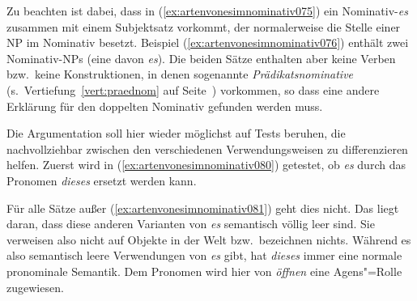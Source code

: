 \begin{exe}
  \ex\label{ex:artenvonesimnominativ073}
  \begin{xlist}
  \end{xlist}
\end{exe}

Zu beachten ist dabei, dass in (\ref{ex:artenvonesimnominativ075}) ein Nominativ-\textit{es} zusammen mit einem Subjektsatz vorkommt, der normalerweise die Stelle einer NP im Nominativ besetzt.
Beispiel (\ref{ex:artenvonesimnominativ076}) enthält zwei Nominativ-NPs (eine davon \textit{es}).
Die beiden Sätze enthalten aber keine Verben bzw.\ keine Konstruktionen, in denen sogenannte \textit{Prädikatsnominative} (s.\ Vertiefung~\ref{vert:praednom} auf Seite~\pageref{vert:praednom}) vorkommen, so dass eine andere Erklärung für den doppelten Nominativ gefunden werden muss.

Die Argumentation soll hier wieder möglichst auf Tests beruhen, die nachvollziehbar zwischen den verschiedenen Verwendungsweisen zu differenzieren helfen.
Zuerst wird in (\ref{ex:artenvonesimnominativ080}) getestet, ob \textit{es} durch das Pronomen \textit{dieses} ersetzt werden kann.


\begin{exe}
  \ex\label{ex:artenvonesimnominativ080}
  \begin{xlist}
  \end{xlist}
\end{exe}


Für alle Sätze außer (\ref{ex:artenvonesimnominativ081}) geht dies nicht.
Das liegt daran, dass diese anderen Varianten von \textit{es} semantisch völlig leer sind.
Sie verweisen also nicht auf Objekte in der Welt bzw.\ bezeichnen nichts.
Während es also semantisch leere Verwendungen von \textit{es} gibt, hat \textit{dieses} immer eine normale pronominale Semantik.
Dem Pronomen wird hier von \textit{öffnen} eine Agens"=Rolle zugewiesen.

